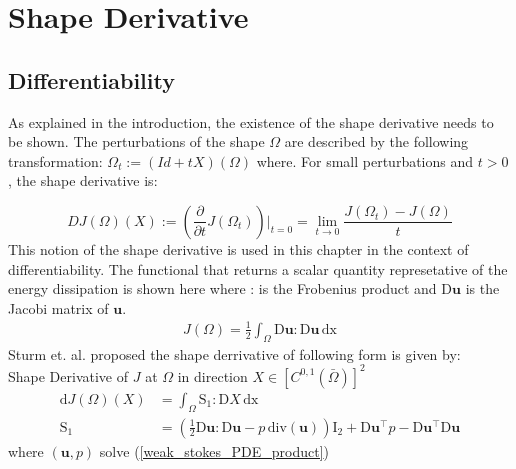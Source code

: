 \section{Shape Derivative}
\subsection{Differentiability}

\vfill

As explained in the introduction, the existence of the shape derivative needs to be shown.
The perturbations of the shape $\Omega$ are described by the following transformation: $\Omega_t := (Id + tX )(\Omega)$ where.
For small perturbations and $t > 0$, the shape derivative is: \cite{fully_semi_paper_sturm}

\begin{equation}\label{shape_derrivative_t_limit}
	DJ(\Omega)(X) := \left(\frac{\partial}{\partial t}J(\Omega_t)\right)\bigg\rvert_{t=0} = \lim_{t \to 0} \frac{J(\Omega_t)-J(\Omega)}{t}
\end{equation}
This notion of the shape derivative is used in this chapter in the context of differentiability. The functional that returns a scalar quantity 
represetative of the energy dissipation is shown here where : is the Frobenius product and $\mathrm{D} \mathbf{u}$ is the Jacobi matrix of $\mathbf{u}$.
\begin{align}\label{energy_dissipation_equation}
	J(\Omega) = \frac{1}{2} \int_{\Omega} \mathrm{D} \mathbf{u} : \mathrm{D} \mathbf{u} \, \mathrm{dx}
\end{align}
Sturm et. al. \cite{nearly_conformal_paper} proposed the shape derrivative of following form is given by: \\
Shape Derivative of $J$ at $\Omega$ in direction $ X \in [C^{0,1}(\bar{\Omega})]^2 $
\begin{align}\label{shape_derivative_S1}
	\mathrm{d}J(\Omega)(X) &= \int_{\Omega} \mathrm{S}_1 : \mathrm{D}X \, \mathrm{dx} \\
	\mathrm{S}_1 &= \left( \frac{1}{2}\mathrm{D} \mathbf{u} : \mathrm{D} \mathbf{u} - p \, \mathrm{div}(\mathbf{u}) \right)
	\mathrm{I}_2 + \mathrm{D} \mathbf{u}^{\top}p - \mathrm{D} \mathbf{u}^{\top} \mathrm{D} \mathbf{u}
\end{align}
where $(\mathbf{u},p)$ solve (\ref*{weak_stokes_PDE_product})
